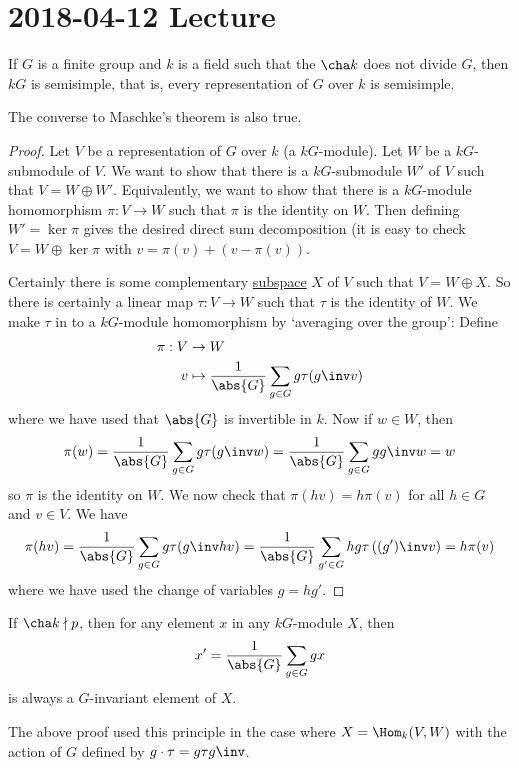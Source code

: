 \section{2018-04-12 Lecture}

\begin{thm}
	If $G$ is a finite group and $k$ is a field such that the $\cha k$ does not divide $G$, then $kG$ is semisimple, that is, every representation of $G$ over $k$ is semisimple.
\end{thm}

\begin{rmk}
	The converse to Maschke's theorem is also true.
\end{rmk}

\begin{proof}
	Let $V$ be a representation of $G$ over $k$ (a $kG$-module).
	Let $W$ be a $kG$-submodule of $V$.
	We want to show that there is a $kG$-submodule $W'$ of $V$ such that $V=W\oplus W'$.
	Equivalently, we want to show that there is a $kG$-module homomorphism $\pi: V \to W$ such that $\pi$ is the identity on $W$.
	Then defining $W'=\ker\pi$ gives the desired direct sum decomposition (it is easy to check $V=W\oplus\ker\pi$ with $v=\pi(v)+(v-\pi(v))$.
	
	Certainly there is some complementary \underline{subspace} $X$ of $V$ such that $V=W\oplus X$.
	So there is certainly a linear map $\tau:V \to W$ such that $\tau$ is the identity of $W$.
	We make $\tau$ in to a $kG$-module homomorphism by `averaging over the group':
	Define
	\begin{align*}
		\pi: V &\to W \\
		v &\mapsto \frac 1{\abs{G}} \sum_{g \in G} g \tau(g\inv v)
	\end{align*}
	where we have used that $\abs{G}$ is invertible in $k$.	
	Now if $w \in W$, then
	\[\pi(w) = \frac 1{\abs{G}} \sum_{g \in G} g\tau(g\inv w) = \frac 1{\abs{G}} \sum_{g \in G} gg\inv w = w \]
	so $\pi$ is the identity on $W$.
	We now check that $\pi(hv)=h\pi(v)$ for all $h \in G$ and $v \in V$.
	We have
	\[\pi(hv) = \frac 1{\abs{G}} \sum_{g \in G} g\tau(g\inv hv) = \frac 1{\abs{G}} \sum_{g' \in G} hg\tau\left((g')\inv v\right) = h\pi(v)\]
	where we have used the change of variables $g=hg'$.
\end{proof}

\begin{rmk}
	If $\cha k \nmid p$, then for any element $x$ in any $kG$-module $X$, then
	\[x' = \frac 1{\abs{G}} \sum_{g \in G} gx\]
	is always a $G$-invariant element of $X$.
	
	The above proof used this principle in the case where $X=\Hom_k(V,W)$ with the action of $G$ defined by $g \cdot\tau = g\tau g\inv$.
\end{rmk}


